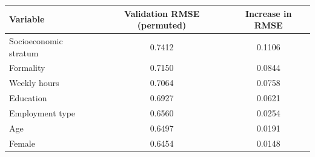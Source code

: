 \begin{tabular}{lcc}
\toprule
Variable & Validation RMSE (permuted) & Increase in RMSE \\
\midrule
Socioeconomic stratum & 0.7412 & 0.1106 \\
Formality & 0.7150 & 0.0844 \\
Weekly hours & 0.7064 & 0.0758 \\
Education & 0.6927 & 0.0621 \\
Employment type & 0.6560 & 0.0254 \\
Age & 0.6497 & 0.0191 \\
Female & 0.6454 & 0.0148 \\
\bottomrule
\end{tabular}
